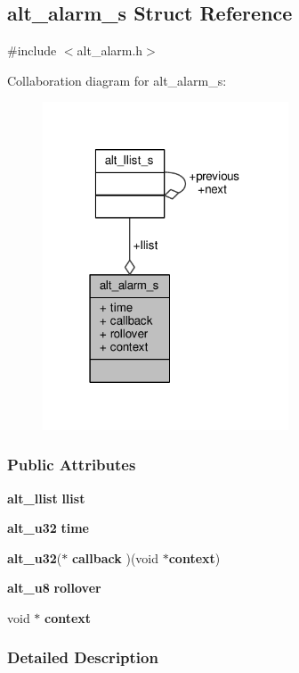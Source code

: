 \subsection{alt\+\_\+alarm\+\_\+s Struct Reference}
\label{structalt__alarm__s}


{\ttfamily \#include $<$alt\+\_\+alarm.\+h$>$}



Collaboration diagram for alt\+\_\+alarm\+\_\+s\+:
\nopagebreak
\begin{figure}[H]
\begin{center}
\leavevmode
\includegraphics[width=207pt]{de/d16/structalt__alarm__s__coll__graph}
\end{center}
\end{figure}
\subsubsection*{Public Attributes}
\begin{DoxyCompactItemize}
\item 
{\bf alt\+\_\+llist} {\bf llist}
\item 
{\bf alt\+\_\+u32} {\bf time}
\item 
{\bf alt\+\_\+u32}($\ast$ {\bf callback} )(void $\ast${\bf context})
\item 
{\bf alt\+\_\+u8} {\bf rollover}
\item 
void $\ast$ {\bf context}
\end{DoxyCompactItemize}


\subsubsection{Detailed Description}



